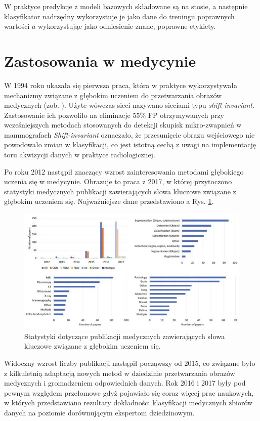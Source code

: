W praktyce predykcje z modeli bazowych składowane są na stosie, a następnie klasyfikator nadrzędny wykorzystuje je jako dane do treningu poprawnych wartości $a$ wykorzystując jako odniesienie znane, poprawne etykiety.
 

\section{Zastosowania w medycynie}

W 1994 roku ukazała się pierwsza praca, która w praktyce wykorzystywała mechanizmy związane z głębokim uczeniem do przetwarzania obrazów medycznych (zob. \cite{Zhang1994}). Użyte wówczas sieci nazywano sieciami typu \textit{shift-invariant}. Zastosowanie ich pozwoliło na eliminacje 55\% FP otrzymywanych przy wcześniejszych metodach stosowanych do detekcji skupisk mikro-zwapnień w mammografach \textit{Shift-invariant} oznaczało, że przesunięcie obrazu wejściowego nie powodowało zmian w klasyfikacji, co jest istotną cechą z uwagi na implementację toru akwizycji danych w praktyce radiologicznej.

Po roku 2012 nastąpił znaczący wzrost zainteresowania metodami głębokiego uczenia się w medycynie. Obrazuje to praca \cite{Litjens2017} z 2017, w której przytoczono statystyki medycznych publikacji zawierających słowa kluczowe związane z głębokim uczeniem się. Najważniejsze dane przedstawiono a Rys. \ref{DL_CAD_stats}.
\begin{figure}[h!]
	\centering
	\includegraphics[width=1\textwidth]{figures/DL_CAD_statystyka.jpg}
	\caption{Statystyki dotyczące publikacji medycznych zawierających słowa kluczowe związane z głębokim uczeniem się.}
	\label{DL_CAD_stats}
\end{figure}

 Widoczny wzrost liczby publikacji nastąpił począwszy od 2015, co związane było z kilkuletnią adaptacją nowych metod w dziedzinie przetwarzania obrazów medycznych i gromadzeniem odpowiednich danych. Rok 2016 i 2017 były pod pewnym względem przełomowe gdyż pojawiało się coraz więcej prac naukowych, w których przedstawiano rezultaty dokładności klasyfikacji medycznych zbiorów danych na poziomie dorównującym ekspertom dziedzinowym.
 
